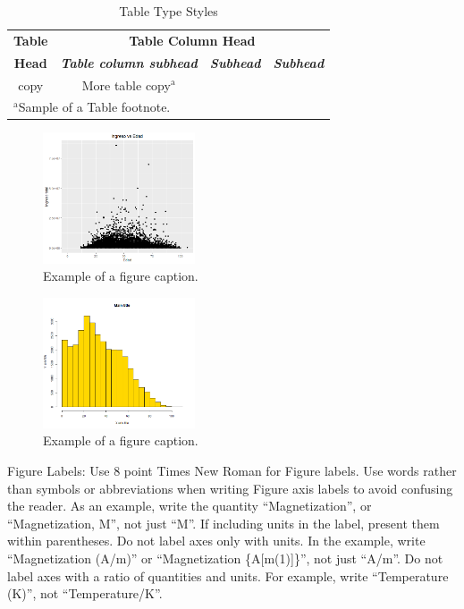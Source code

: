 \documentclass[conference, 10pt]{IEEEtran}
\begin{document}
\begin{table}[htbp]
\caption{Table Type Styles}
\begin{center}
\begin{tabular}{|c|c|c|c|}
\hline
\textbf{Table}&\multicolumn{3}{|c|}{\textbf{Table Column Head}} \\
\cline{2-4} 
\textbf{Head} & \textbf{\textit{Table column subhead}}& \textbf{\textit{Subhead}}& \textbf{\textit{Subhead}} \\
\hline
copy& More table copy$^{\mathrm{a}}$& &  \\
\hline
\multicolumn{4}{l}{$^{\mathrm{a}}$Sample of a Table footnote.}
\end{tabular}
\label{tab1}
\end{center}
\end{table}

\begin{figure}[htbp]
\centerline{\includegraphics[width=0.4\textwidth]{../Vistas/Rplot01.png}}
\caption{Example of a figure caption.}
\label{fig}
\end{figure}

\begin{figure}[htbp]
\centerline{\includegraphics[width=0.4\textwidth]{../Vistas/Graficca_3.png}}
\caption{Example of a figure caption.}
\label{fig2}
\end{figure}

Figure Labels: Use 8 point Times New Roman for Figure labels. Use words 
rather than symbols or abbreviations when writing Figure axis labels to 
avoid confusing the reader. As an example, write the quantity 
``Magnetization'', or ``Magnetization, M'', not just ``M''. If including 
units in the label, present them within parentheses. Do not label axes only 
with units. In the example, write ``Magnetization (A/m)'' or ``Magnetization 
\{A[m(1)]\}'', not just ``A/m''. Do not label axes with a ratio of 
quantities and units. For example, write ``Temperature (K)'', not 
``Temperature/K''.
\end{document}
